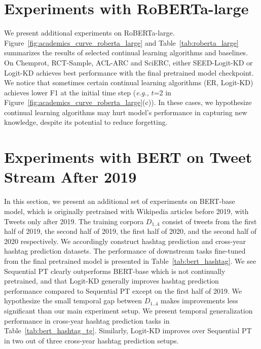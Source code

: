 




\section{Experiments with RoBERTa-large}
We present additional experiments on RoBERTa-large. Figure~\ref{fig:academics_curve_roberta_large} and Table~\ref{tab:roberta_large} summarizes the results of selected continual learning algorithms and baselines. On Chemprot, RCT-Sample, ACL-ARC and SciERC, either SEED-Logit-KD or Logit-KD achieves best performance with the final pretrained model checkpoint. We notice that sometimes certain continual learning algorithms (ER, Logit-KD) achieves lower F1 at the initial time step  (\textit{e.g.,} $t$=2 in Figure~\ref{fig:academics_curve_roberta_large}(c)). In these cases, we hypothesize continual learning algorithms may hurt model's performance in capturing new knowledge, despite its potential to reduce forgetting. 







\section{Experiments with BERT on Tweet Stream After 2019}





In this section, we present an additional set of experiments on BERT-base~\cite{Devlin2019BERTPO} model, which is originally pretrained with Wikipedia articles before 2019, with Tweets only after 2019. The training corpora $D_{1..4}$ consist of tweets from the first half of 2019, the second half of 2019, the first half of 2020, and the second half of 2020 respectively. We accordingly construct hashtag prediction and cross-year hashtag prediction datasets. The performance of downstream tasks fine-tuned from the final pretrained model is presented in Table~\ref{tab:bert_hashtag}. We see Sequential PT clearly outperforms BERT-base which is not continually pretrained, and that Logit-KD generally improves hashtag prediction performance compared to Sequential PT except on the first half of 2019. We hypothesize the small temporal gap between $D_{1..4}$ makes improvements less significant than our main experiment setup. We present temporal generalization performance in cross-year hashtag prediction tasks in Table~\ref{tab:bert_hashtag_tg}. Similarly, Logit-KD improves over Sequential PT in two out of three cross-year hashtag prediction setups.

